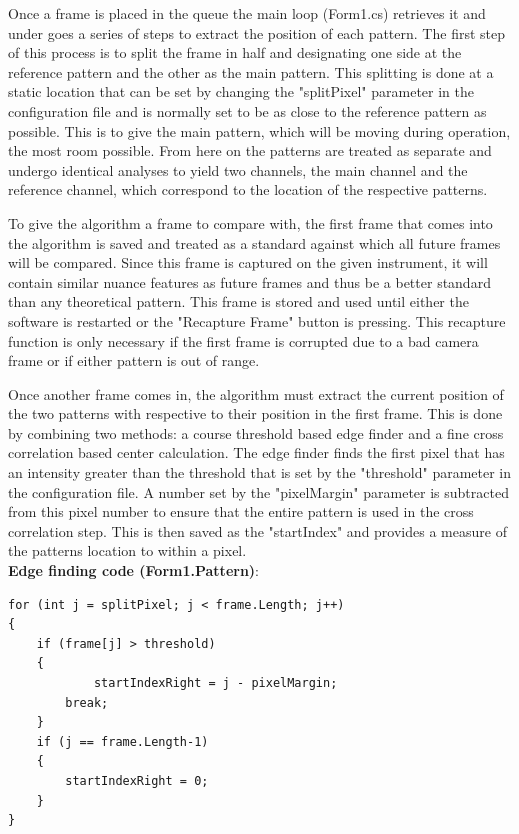 \documentclass{article}
\begin{document}
Once a frame is placed in the queue the main loop (Form1.cs) retrieves it and under goes a series of steps to extract the position of each pattern. The first step of this process is to split the frame in half and designating one side at the reference pattern and the other as the main pattern. This splitting is done at a static location that can be set by changing the "splitPixel" parameter in the configuration file and is normally set to be as close to the reference pattern as possible. This is to give the main pattern, which will be moving during operation, the most room possible. From here on the patterns are treated as separate and undergo identical analyses to yield two channels, the main channel and the reference channel, which correspond to the location of the respective patterns.

To give the algorithm a frame to compare with, the first frame that comes into the algorithm is saved and treated as a standard against which all future frames will be compared. Since this frame is captured on the given instrument, it will contain similar nuance features as future frames and thus be  a better standard than any theoretical pattern. This frame is stored and used until either the software is restarted or the "Recapture Frame" button is pressing. This recapture function is only necessary if the first frame is corrupted due to a bad camera frame or if either pattern is out of range.

Once another frame comes in, the algorithm must extract the current position of the two patterns with respective to their position in the first frame. This is done by combining two methods: a course threshold based edge finder and a fine cross correlation based center calculation. The edge finder finds the first pixel that has an intensity greater than the threshold that is set by the "threshold" parameter in the configuration file. A number set by the "pixelMargin" parameter is subtracted from this pixel number to ensure that the entire pattern is used in the cross correlation step. This is then saved as the "startIndex" and provides a measure of the patterns location to within a pixel. \\

\textbf{Edge finding code (Form1.Pattern)}:
\begin{lstlisting}                 
for (int j = splitPixel; j < frame.Length; j++)
{
	if (frame[j] > threshold)
	{
    		startIndexRight = j - pixelMargin;
		break;
	}
	if (j == frame.Length-1)
	{
		startIndexRight = 0;
	}
}
\end{lstlisting}
\end{document}
